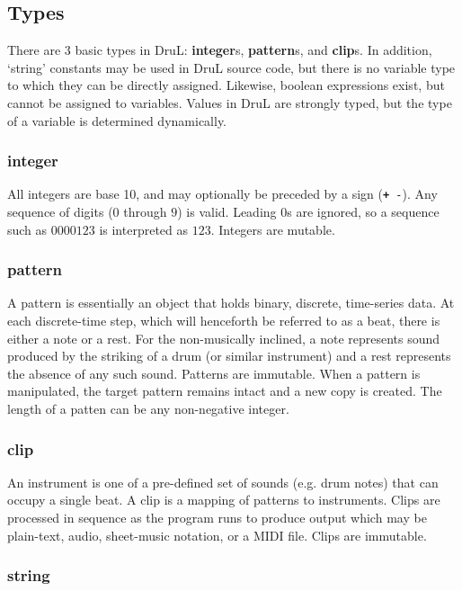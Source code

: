 \documentclass[11pt,twoside]{article}
\begin{document}
\subsection{Types}

There are $3$ basic types in DruL: \textbf{integer}s, \textbf{pattern}s,
and \textbf{clip}s.  In addition, `string' constants may be used in DruL source code, but there is no variable type to which they can be directly assigned.
Likewise, boolean expressions exist, but cannot be assigned to variables.
Values in DruL are strongly typed, but the type of a variable is determined dynamically.

\subsubsection{integer}

All integers are base 10, and may optionally be preceded by a sign ({\tt \textbf + -}).
Any sequence of digits ($0$ through $9$) is valid.  Leading $0$s are ignored, so a sequence such as $0000123$  is interpreted as $123$.  Integers are mutable.

\subsubsection{pattern}

A pattern is essentially an object that holds binary, discrete, time-series data.  At each discrete-time step, which will henceforth be referred to as a beat, there is either a note or a rest.  For the non-musically inclined, a note represents sound produced by the striking of a drum (or similar instrument) and a rest represents the absence of any such sound.  Patterns are immutable.  When a pattern is manipulated, the target pattern remains intact and a new copy is created.  The length of a patten can be any non-negative integer.

\subsubsection{clip}

An instrument is one of a pre-defined set of sounds (e.g. drum notes) that can occupy a single beat.
A clip is a mapping of patterns to instruments. Clips are processed in sequence as the program runs to produce output which may be plain-text, audio, sheet-music notation, or a MIDI file.  Clips are immutable.

\subsubsection{string}
\end{document}
